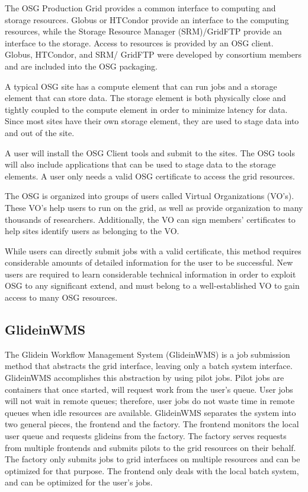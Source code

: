 The OSG Production Grid provides a common interface to computing and storage resources. Globus or HTCondor provide an interface to the computing resources, while the Storage Resource Manager (SRM)/GridFTP provide an interface to the storage.  Access to resources is provided by an OSG client.  Globus, HTCondor, and SRM/ GridFTP were developed by consortium members and are included into the OSG packaging.

A typical OSG site has a compute element that can run jobs and a storage element that can store data.  The storage element is both physically close and tightly coupled to the compute element in order to minimize latency for data.  Since most sites have their own storage element, they are used to stage data into and out of the site.

A user will install the OSG Client tools and submit to the sites.  The OSG tools will also include applications that can be used to stage data to the storage elements.  A user only needs a valid OSG certificate to access the grid resources.  

The OSG is organized into groups of users called Virtual Organizations (VO's).  These VO's help users to run on the grid, as well as provide organization to many thousands of researchers.  Additionally, the VO can sign members' certificates to help sites identify users as belonging to the VO.

While users can directly submit jobs with a valid certificate, this method requires considerable amounts of detailed information for the user to be successful.  New users are required to learn considerable technical information in order to exploit OSG to any significant extend, and must belong to a well-established VO to gain access to many OSG resources.

\subsection{GlideinWMS}
The Glidein Workflow Management System (GlideinWMS) \cite{sfiligoi2008glideinwms} is a job submission method that abstracts the grid interface, leaving only a batch system interface.  GlideinWMS accomplishes this abstraction by using pilot jobs.  Pilot jobs are containers that once started, will request work from the user's queue.  User jobs will not wait in remote queues; therefore, user jobs do not waste time in remote queues when idle resources are available.  GlideinWMS separates the system into two general pieces, the frontend and the factory.  The frontend monitors the local user queue and requests glideins from the factory.  The factory serves requests from multiple frontends and submits pilots to the grid resources on their behalf.  The factory only submits jobs to grid interfaces on multiple resources and can be optimized for that purpose.  The frontend only deals with the local batch system, and can be optimized for the user's jobs.
 
